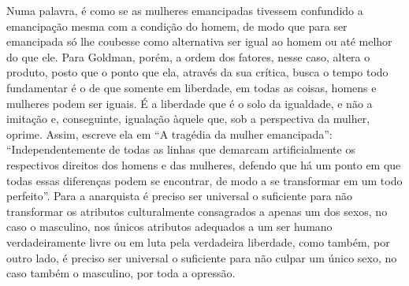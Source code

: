 Numa palavra, é como se as mulheres emancipadas tivessem
confundido a emancipação mesma com a condição do homem, de modo que para
ser emancipada só lhe coubesse como alternativa ser igual ao homem ou
até melhor do que ele. Para Goldman, porém, a ordem dos fatores, nesse
caso, altera o produto, posto que o ponto que ela, através da sua
crítica, busca o tempo todo fundamentar é o de que somente em liberdade,
em todas as coisas, homens e mulheres podem ser iguais. É a liberdade
que é o solo da igualdade, e não a imitação e, conseguinte, igualação
àquele que, sob a perspectiva da mulher, oprime. Assim, escreve ela em
``A tragédia da mulher emancipada'': ``Independentemente de todas as
linhas que demarcam artificialmente os respectivos direitos dos homens e
das mulheres, defendo que há um ponto em que todas essas diferenças
podem se encontrar, de modo a se transformar em um todo perfeito''. Para
a anarquista é preciso ser universal o suficiente para não transformar
os atributos culturalmente consagrados a apenas um dos sexos, no caso o
masculino, nos únicos atributos adequados a um ser humano
verdadeiramente livre ou em luta pela verdadeira liberdade, como também,
por outro lado, é preciso ser universal o suficiente para não culpar um
único sexo, no caso também o masculino, por toda a opressão.

